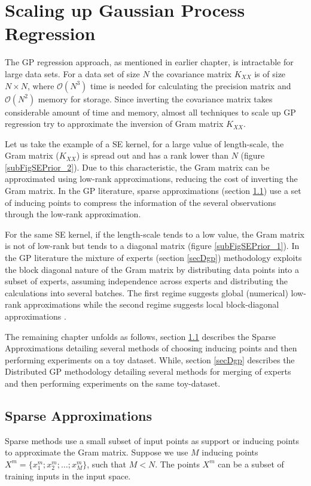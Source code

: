 \chapter{Scaling up Gaussian Process Regression}
\label{chapScalingGPR}

The GP regression approach, as mentioned in earlier chapter, is intractable for large data sets. For a data set of size $N$ the covariance matrix $K_{XX}$ is of size $N \times N$,  where $\mathcal{O}\left ( N^{3} \right )$ time is needed for calculating the precision matrix and $\mathcal{O}\left ( N^{2} \right )$ memory for storage. Since inverting the covariance matrix takes considerable amount of time and memory, almost all techniques to scale up GP regression try to approximate the inversion of Gram matrix $K_{XX}$. 

Let us take the example of a SE kernel, for a large value of length-scale, the Gram matrix ($K_{XX}$) is spread out and has a rank lower than  $N$ (figure \ref{subFigSEPrior_2}). Due to this characteristic, the Gram matrix can be approximated using low-rank approximations, reducing the cost of inverting the Gram matrix. In the GP literature, sparse approximations (section \ref{secSparseApprox}) use a set of inducing points to compress the information of the several observations through the low-rank approximation. 

For the same SE kernel, if the length-scale tends to a low value, the Gram matrix is not of low-rank but tends to a diagonal matrix (figure \ref{subFigSEPrior_1}). In the GP literature the mixture of experts (section \ref{secDgp}) methodology exploits the block diagonal nature of the Gram matrix by distributing data points into a subset of experts, assuming independence across experts and distributing the calculations into several batches. The first regime suggests global (numerical) low-rank approximations while the second regime suggests local block-diagonal approximations \cite{march2015askit, chenhan2016inv}. 

The remaining chapter unfolds as follows, section \ref{secSparseApprox} describes the Sparse Approximations detailing several methods of choosing inducing points and then performing experiments on a toy dataset. While, section \ref{secDgp} describes the Distributed GP methodology detailing several methods for merging of experts and then performing experiments on the same toy-dataset. 

\section{Sparse Approximations}\label{secSparseApprox}
Sparse methods use a small subset of input points as support or inducing points to approximate the Gram matrix. Suppose we use $M$ inducing points $X^{m} = \{x^{m}_{1}; x^{m}_{2}; \ldots; x^{m}_{M}\}$, such that $M < N$. The points $X^{m}$ can be a subset of training inputs in the input space. 


